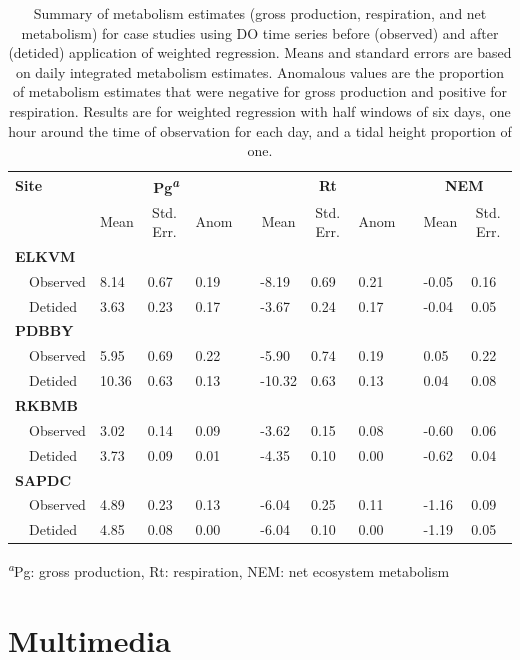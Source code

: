 \documentclass[letterpaper,12pt,oneside]{article}\usepackage[]{graphicx}\usepackage[]{color}
\begin{document}
%
\begin{table}[!tbp]
\caption{Summary of metabolism estimates (gross production, respiration, and net metabolism) for case studies using \ac{DO} time series before (observed) and after (detided) application of weighted regression.  Means and standard errors are based on daily integrated metabolism estimates.  Anomalous values are the proportion of metabolism estimates that were negative for gross production and positive for respiration.  Results are for weighted regression with half windows of six days, one hour around the time of observation for each day, and a tidal height proportion of one.\label{tab:case_res}} 
\begin{center}
\begin{tabular}{llllclllcll}
\hline\hline
\multicolumn{1}{l}{\bfseries Site}&\multicolumn{3}{c}{\bfseries Pg\textsuperscript{\textit{a}}}&\multicolumn{1}{c}{\bfseries }&\multicolumn{3}{c}{\bfseries Rt}&\multicolumn{1}{c}{\bfseries }&\multicolumn{2}{c}{\bfseries NEM}\tabularnewline
\cline{2-4} \cline{6-8} \cline{10-11}
\multicolumn{1}{l}{}&\multicolumn{1}{c}{Mean}&\multicolumn{1}{c}{Std. Err.}&\multicolumn{1}{c}{Anom}&\multicolumn{1}{c}{}&\multicolumn{1}{c}{Mean}&\multicolumn{1}{c}{Std. Err.}&\multicolumn{1}{c}{Anom}&\multicolumn{1}{c}{}&\multicolumn{1}{c}{Mean}&\multicolumn{1}{c}{Std. Err.}\tabularnewline
\hline
{\bfseries ELKVM}&&&&&&&&&&\tabularnewline
~~Observed& 8.14&0.67&0.19&& -8.19&0.69&0.21&&-0.05&0.16\tabularnewline
~~Detided& 3.63&0.23&0.17&& -3.67&0.24&0.17&&-0.04&0.05\tabularnewline
\hline
{\bfseries PDBBY}&&&&&&&&&&\tabularnewline
~~Observed& 5.95&0.69&0.22&& -5.90&0.74&0.19&& 0.05&0.22\tabularnewline
~~Detided&10.36&0.63&0.13&&-10.32&0.63&0.13&& 0.04&0.08\tabularnewline
\hline
{\bfseries RKBMB}&&&&&&&&&&\tabularnewline
~~Observed& 3.02&0.14&0.09&& -3.62&0.15&0.08&&-0.60&0.06\tabularnewline
~~Detided& 3.73&0.09&0.01&& -4.35&0.10&0.00&&-0.62&0.04\tabularnewline
\hline
{\bfseries SAPDC}&&&&&&&&&&\tabularnewline
~~Observed& 4.89&0.23&0.13&& -6.04&0.25&0.11&&-1.16&0.09\tabularnewline
~~Detided& 4.85&0.08&0.00&& -6.04&0.10&0.00&&-1.19&0.05\tabularnewline
\hline
\end{tabular}
\end{center}
\textsuperscript{\textit{a}}Pg: gross production, Rt: respiration, NEM: net ecosystem metabolism\end{table}


\clearpage


\raggedbottom
\raggedright
\setlength{\parindent}{0.5in}

\section{Multimedia} \label{multi}

\end{document}
